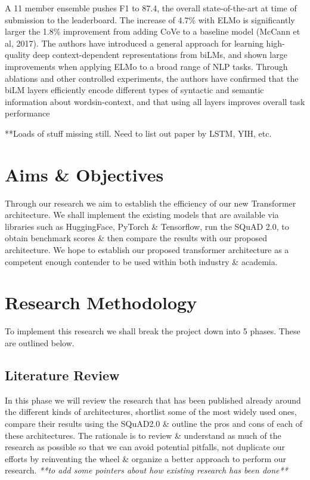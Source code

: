 \documentclass[11pt]{article}
\begin{document}
\begin{enumerate}
    A 11 member ensemble pushes F1 to 87.4, the overall state-of-the-art at time of submission to the leaderboard. The increase of 4.7\% with ELMo is significantly larger the 1.8\% improvement from adding CoVe to a baseline model (McCann et al, 2017).  The authors have introduced a general approach for learning high-quality deep context-dependent representations from biLMs, and shown large improvements when applying ELMo to a broad range of NLP tasks.
    Through ablations and other controlled experiments, the authors have confirmed that the biLM layers efficiently encode different types of syntactic and semantic information about wordsin-context, and that using all layers improves overall task performance
    \cite{contextualized}
\end{enumerate}

**Loads of stuff missing still. Need to list out paper by LSTM, YIH, etc.
\newpage
\newpage
\section{Aims \& Objectives}

Through our research we aim to establish the efficiency of our new Transformer architecture. We shall implement the existing models that are available via libraries such as HuggingFace\cite{hfTransformers}, PyTorch \& Tensorflow, run the SQuAD 2.0\cite{dataset}, to obtain benchmark scores \& then compare the results with our proposed architecture. We hope to establish our proposed transformer architecture as a competent enough contender to be used within both industry \& academia.
\section{Research Methodology}

To implement this research we shall break the project down into 5 phases. These are outlined below.
\subsection{Literature Review}
In this phase we will review the research that has been published already around the different kinds of architectures, shortlist some of the most widely used ones, compare their results using the SQuAD2.0 \cite{dataset} \& outline the pros and cons of each of these architectures. The rationale is to review \& understand as much of the research as possible so that we can avoid potential pitfalls, not duplicate our efforts by reinventing the wheel \& organize a better approach to perform our research.\textit{ **to add some pointers about how existing research has been done**}
\end{document}
